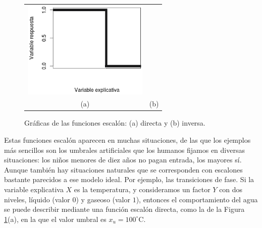 \begin{figure}[htb]
\begin{center}
\begin{bn}
\begin{tabular}{cc}
	\includegraphics[width=6cm]{../fig/Cap13-QueEsperarEscalon2-bn.png}\\[3mm]
	(a) &   (b)\\[2mm]
\end{tabular}		
\end{bn}
     \caption{Gráficas de las funciones escalón: (a) directa y (b) inversa.}
     \label{cap13:FuncionEscalon}
\end{center}
\end{figure}

\noindent Estas funciones escalón aparecen en muchas situaciones, de las que los ejemplos más sencillos son los umbrales artificiales que los humanos fijamos en diversas situaciones: los niños menores de diez años no pagan entrada, los mayores sí. Aunque también hay situaciones naturales que se corresponden con escalones bastante parecidos a ese modelo ideal. Por ejemplo, las transiciones de fase. Si la variable explicativa $X$ es la temperatura, y consideramos un factor $Y$ con dos niveles, líquido (valor $0$) y gaseoso (valor $1$), entonces el comportamiento del agua se puede describir mediante una función escalón directa, como la de la Figura \ref{cap13:FuncionEscalon}(a), en la que el valor umbral es $x_u=100^\circ$C.

